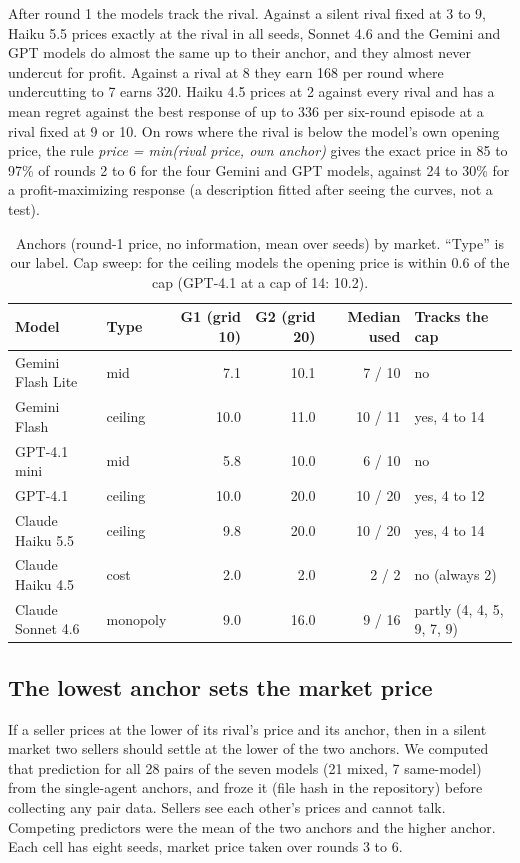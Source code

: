\documentclass[10pt]{article}
\begin{document}
After round 1 the models track the rival. Against a silent rival fixed at 3 to 9, Haiku 5.5 prices exactly at the rival in all seeds, Sonnet 4.6 and the Gemini and GPT models do almost the same up to their anchor, and they almost never undercut for profit. Against a rival at 8 they earn 168 per round where undercutting to 7 earns 320. Haiku 4.5 prices at 2 against every rival and has a mean regret against the best response of up to 336 per six-round episode at a rival fixed at 9 or 10. On rows where the rival is below the model's own opening price, the rule \emph{price = min(rival price, own anchor)} gives the exact price in 85 to 97\% of rounds 2 to 6 for the four Gemini and GPT models, against 24 to 30\% for a profit-maximizing response (a description fitted after seeing the curves, not a test).

\begin{table}[t]\centering\small
\caption{Anchors (round-1 price, no information, mean over seeds) by market. ``Type'' is our label. Cap sweep: for the ceiling models the opening price is within 0.6 of the cap (GPT-4.1 at a cap of 14: 10.2).}\label{tab:anchor}
\begin{tabular}{llrrrl}\toprule
Model & Type & G1 (grid 10) & G2 (grid 20) & Median used & Tracks the cap\\\midrule
Gemini Flash Lite & mid & 7.1 & 10.1 & 7 / 10 & no\\
Gemini Flash & ceiling & 10.0 & 11.0 & 10 / 11 & yes, 4 to 14\\
GPT-4.1 mini & mid & 5.8 & 10.0 & 6 / 10 & no\\
GPT-4.1 & ceiling & 10.0 & 20.0 & 10 / 20 & yes, 4 to 12\\
Claude Haiku 5.5 & ceiling & 9.8 & 20.0 & 10 / 20 & yes, 4 to 14\\
Claude Haiku 4.5 & cost & 2.0 & 2.0 & 2 / 2 & no (always 2)\\
Claude Sonnet 4.6 & monopoly & 9.0 & 16.0 & 9 / 16 & partly (4, 4, 5, 9, 7, 9)\\\bottomrule
\end{tabular}
\end{table}

\subsection{The lowest anchor sets the market price}\label{sec:pairs}
If a seller prices at the lower of its rival's price and its anchor, then in a silent market two sellers should settle at the lower of the two anchors. We computed that prediction for all 28 pairs of the seven models (21 mixed, 7 same-model) from the single-agent anchors, and froze it (file hash in the repository) before collecting any pair data. Sellers see each other's prices and cannot talk. Competing predictors were the mean of the two anchors and the higher anchor. Each cell has eight seeds, market price taken over rounds 3 to 6.
\end{document}
